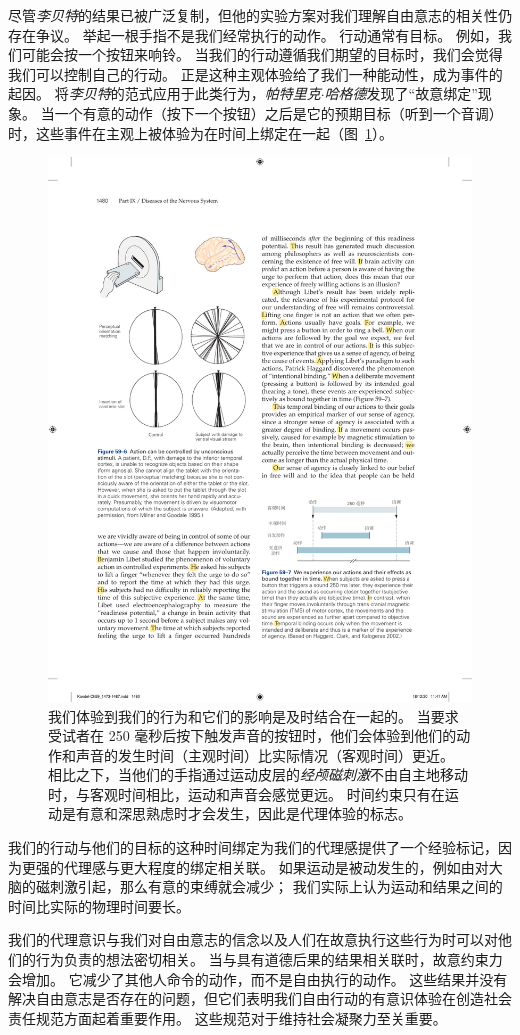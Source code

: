 尽管\textit{李贝特}的结果已被广泛复制，但他的实验方案对我们理解自由意志的相关性仍存在争议。
举起一根手指不是我们经常执行的动作。
行动通常有目标。
例如，我们可能会按一个按钮来响铃。
当我们的行动遵循我们期望的目标时，我们会觉得我们可以控制自己的行动。
正是这种主观体验给了我们一种能动性，成为事件的起因。
将\textit{李贝特}的范式应用于此类行为，\textit{帕特里克$\cdot$哈格德}发现了“故意绑定”现象。
当一个有意的动作（按下一个按钮）之后是它的预期目标（听到一个音调）时，这些事件在主观上被体验为在时间上绑定在一起（图~\ref{fig:59_7}）。


\begin{figure}[htbp]
	\centering
	\includegraphics[width=0.6\linewidth]{chap59/fig_59_7}
	\caption{我们体验到我们的行为和它们的影响是及时结合在一起的。
		当要求受试者在 250 毫秒后按下触发声音的按钮时，他们会体验到他们的动作和声音的发生时间（主观时间）比实际情况（客观时间）更近。
		相比之下，当他们的手指通过运动皮层的\textit{经颅磁刺激}不由自主地移动时，与客观时间相比，运动和声音会感觉更远。
		时间约束只有在运动是有意和深思熟虑时才会发生，因此是代理体验的标志\cite{haggard2002voluntary}。}
	\label{fig:59_7}
\end{figure}


我们的行动与他们的目标的这种时间绑定为我们的代理感提供了一个经验标记，因为更强的代理感与更大程度的绑定相关联。
如果运动是被动发生的，例如由对大脑的磁刺激引起，那么有意的束缚就会减少；
我们实际上认为运动和结果之间的时间比实际的物理时间要长。


我们的代理意识与我们对自由意志的信念以及人们在故意执行这些行为时可以对他们的行为负责的想法密切相关。
当与具有道德后果的结果相关联时，故意约束力会增加。
它减少了其他人命令的动作，而不是自由执行的动作。
这些结果并没有解决自由意志是否存在的问题，但它们表明我们自由行动的有意识体验在创造社会责任规范方面起着重要作用。
这些规范对于维持社会凝聚力至关重要。


